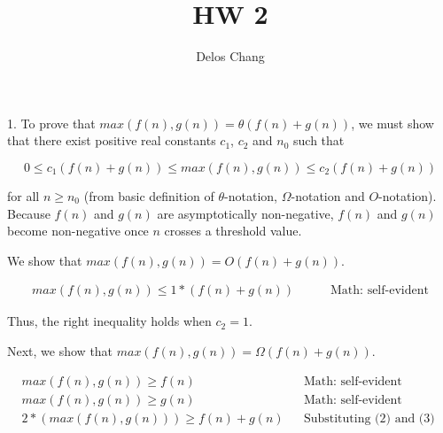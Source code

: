 \documentclass[a4paper]{report}
\title{HW 2}
\author{Delos Chang}
\begin{document}
  \maketitle

  1. To prove that $max(f(n),g(n)) = \theta (f(n) + g(n))$, we must show that there exist positive real constants $c_{1}$, $c_{2}$ and $n_{0}$ such that

    $$0 \leq c_{1}(f(n) + g(n)) \leq max(f(n),g(n)) \leq c_{2}(f(n) + g(n))$$
  
  for all $n \geq n_{0}$ (from basic definition of $\theta$-notation, $\Omega$-notation and $O$-notation). 
  Because $f(n)$ and $g(n)$ are asymptotically non-negative, $f(n)$ and $g(n)$ become non-negative once $n$ crosses a threshold value.

  We show that $max(f(n), g(n)) = O(f(n) + g(n))$.

  \begin{align}
    max(f(n), g(n)) \leq 1 * (f(n) + g(n))              &\quad &\text{ Math: self-evident}
  \end{align}

  Thus, the right inequality holds when $c_{2} = 1$. 

  Next, we show that $max(f(n), g(n)) = \Omega(f(n) + g(n))$.

  \begin{align}
    max(f(n), g(n)) \geq  f(n)                          &&\text{Math: self-evident}\\
    max(f(n), g(n)) \geq  g(n)                          &&\text{Math: self-evident}\\
    2 * (max(f(n),g(n))) \geq f(n) + g(n)               &&\text{Substituting (2) and (3) }
  \end{align}
    

    
\end{document}
